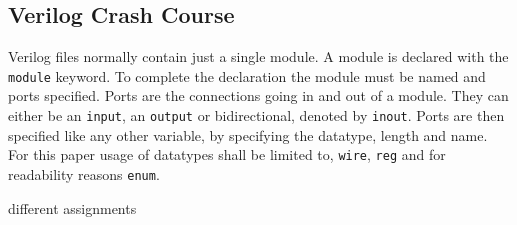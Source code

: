 \subsection{Verilog Crash Course}
Verilog files normally contain just a single module. A module is declared with the \texttt{module} keyword. To complete the declaration the module must be named and ports specified. Ports are the connections going in and out of a module. They can either be an \texttt{input}, an \texttt{output} or bidirectional, denoted by \texttt{inout}. Ports are then specified like any other variable, by specifying the datatype, length and name. For this paper usage of datatypes shall be limited to, \texttt{wire}, \texttt{reg} and for readability reasons \texttt{enum}.  

different assignments